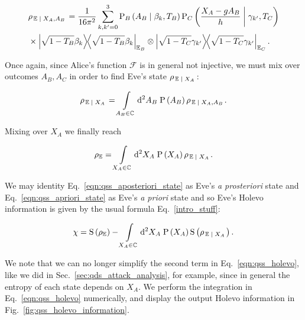 \begin{align}\label{eqn:qss_deriv_8}
&\rho_{\left. \mathbb{E} \given X_A, A_B\right.} = \frac{1}{16 \pi^2} \sum_{k, k^\prime = 0}^3 \text{P}_B\left(A_B \given \beta_k, T_B\right) \text{P}_C\left(\frac{X_A - g A_B}{h} \given \gamma_{k^\prime}, T_C\right) \notag \\
%
&\times \dyad{\sqrt{1-T_B} \beta_k}_{\mathbb{E}_B} \otimes \dyad{\sqrt{1-T_C}\gamma_{k^\prime}}_{\mathbb{E}_C}.
\end{align}

\noindent Once again, since Alice's function $\mathcal{F}$ is in general not injective, we must mix over outcomes $A_B, A_C$ in order to find Eve's state $\rho_{\left.\mathbb{E} \; \middle| \; X_A\right.}$:

\begin{equation}\label{eqn:qss_aposteriori_state}
\rho_{\left.\mathbb{E} \; \middle| \; X_A\right.} = \int\limits_{A_B \in \mathbb{C}} \mathop{}\!\mathrm{d^2} A_B \; \text{P}\left(A_B\right) \rho_{\left.\mathbb{E} \; \middle| \; X_A, A_B\right.}.
\end{equation}

\noindent Mixing over $X_A$ we finally reach

\begin{equation}\label{eqn:qss_apriori_state}
\rho_{\mathbb{E}} = \int\limits_{X_A \in \mathbb{C}} \mathop{}\!\mathrm{d^2} X_A \; \text{P}\left(X_A\right) \rho_{\left.\mathbb{E}\; \middle| \; X_A\right.}.
\end{equation}

\noindent We may identity Eq.~\ref{eqn:qss_aposteriori_state} as Eve's \emph{a prosteriori} state and Eq.~\ref{eqn:qss_apriori_state} as Eve's \emph{a priori} state and so Eve's Holevo information is given by the usual formula Eq.~\ref{intro_stuff}:

\begin{equation}\label{eqn:qss_holevo}
\chi = \text{S}\left(\rho_\mathbb{E}\right) - \int\limits_{X_A \in \mathbb{C}} \mathop{}\!\mathrm{d^2} X_A \; \text{P}\left(X_A\right) \text{S}\left(\rho_{\left.\mathbb{E} \; \middle| \; X_A\right.}\right).
\end{equation}

We note that we can no longer simplify the second term in Eq.~\ref{eqn:qss_holevo}, like we did in Sec.~\ref{sec:qds_attack_analysis}, for example, since in general the entropy of each state depends on $X_A$. We perform the integration in Eq.~\ref{eqn:qss_holevo} numerically, and display the output Holevo information in Fig.~\ref{fig:qss_holevo_information}.


